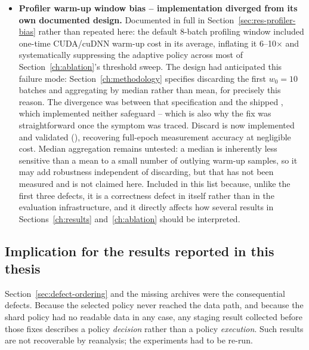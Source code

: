 \begin{itemize}
    actually been logged. Both non-SegFormer paths now use the buffered
    subclass; this was confirmed by a full run reaching the expected metric
    before the Table~\ref{tab:repro-full} results were collected.
  \item \textbf{Profiler warm-up window bias -- implementation diverged from its
    own documented design.} Documented in full in
    Section~\ref{sec:res-profiler-bias} rather than repeated here: the default
    8-batch profiling window included one-time CUDA/cuDNN warm-up cost in its
    \Tgpu{} average, inflating it 6--10$\times$ and systematically suppressing
    the adaptive policy across most of Section~\ref{ch:ablation}'s threshold
    sweep. The design had anticipated this failure mode:
    Section~\ref{ch:methodology} specifies discarding the first $w_0=10$
    batches and aggregating by median rather than mean, for precisely this
    reason. The divergence was between that specification and the shipped
    , which implemented neither safeguard --
    which is also why the fix was straightforward once the symptom was
    traced. Discard is now implemented and validated
    (), recovering full-epoch measurement accuracy at
    negligible cost. Median aggregation remains untested: a median is
    inherently less sensitive than a mean to a small number of outlying
    warm-up samples, so it may add robustness independent of discarding, but
    that has not been measured and is not claimed here.
    Included in this list because, unlike the first three defects, it is a
    correctness defect in \pads{} itself rather than in the evaluation
    infrastructure, and it directly affects how several results in
    Sections~\ref{ch:results} and~\ref{ch:ablation} should be interpreted.
\end{itemize}

\subsection{Implication for the results reported in this thesis}

Section~\ref{sec:defect-ordering} and the missing archives were the consequential
defects. Because the selected policy never reached the data path, and because the
shard policy had no readable data in any case, any staging result collected
before those fixes describes a policy \emph{decision} rather than a policy
\emph{execution}. Such results are not recoverable by reanalysis; the
experiments had to be re-run.

